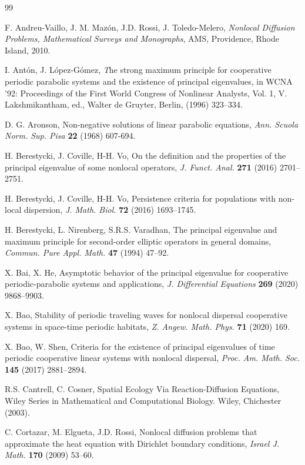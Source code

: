 \documentclass[11pt,reqno]{amsart}
\numberwithin{equation}{section}
\begin{document}
\begin{thebibliography}{99}

 F. Andreu-Vaillo, J. M. Maz\'on, J.D. Rossi, J. Toledo-Melero, \emph{Nonlocal Diffusion Problems, Mathematical Surveys and Monographs}, AMS, Providence, Rhode Island, 2010.

I. Ant\'on, J. L\'opez-G\'omez, 
{\emph The strong maximum principle for cooperative periodic parabolic systems and the existence of principal eigenvalues}, in WCNA '92: Proceedings of
the First World Congress of Nonlinear Analysts, Vol. 1, V. Lakshmikantham, ed., Walter
de Gruyter, Berlin, (1996) 323--334.

 D. G. Aronson, Non-negative solutions of linear parabolic equations, \emph{Ann. Scuola Norm. Sup. Pisa} {\bf 22} (1968) 607-694.


 H. Berestycki, J. Coville, H-H. Vo, On the definition and the properties of the principal eigenvalue of some nonlocal operators, \emph{J. Funct. Anal.} {\bf 271} (2016) 2701--2751.

 H. Berestycki, J. Coville, H-H. Vo, Persistence criteria for populations with non-local dispersion, \emph{J. Math. Biol.} {\bf 72} (2016) 1693--1745.

H. Berestycki, L. Nirenberg, S.R.S. Varadhan,  The principal eigenvalue and maximum principle for
second-order elliptic operators in general domains, \emph{Commun. Pure Appl. Math.} {\bf 47} (1994) 47--92.

X. Bai, X. He,
Asymptotic behavior of the principal eigenvalue for cooperative periodic-parabolic systems and applications, \emph{J. Differential Equations} {\bf 269} (2020) 9868--9903.


 X. Bao, Stability of periodic traveling waves for nonlocal dispersal cooperative systems in space-time periodic habitats, \emph{Z. Angew. Math. Phys.} {\bf 71} (2020) 169.

X. Bao, W. Shen, Criteria for the existence of principal eigenvalues of time periodic
cooperative linear systems with nonlocal dispersal, \emph{Proc. Am. Math. Soc.} {\bf 145} (2017) 2881--2894.


 R.S. Cantrell, C. Cosner, Spatial Ecology Via Reaction-Diffusion Equations, Wiley Series in Mathematical and Computational Biology. Wiley, Chichester (2003).

C. Cortazar, M. Elgueta, J.D. Rossi, Nonlocal diffusion problems that approximate the heat equation with Dirichlet
boundary conditions, \emph{Israel J. Math.} {\bf 170} (2009) 53--60.


\end{thebibliography}
\end{document}
